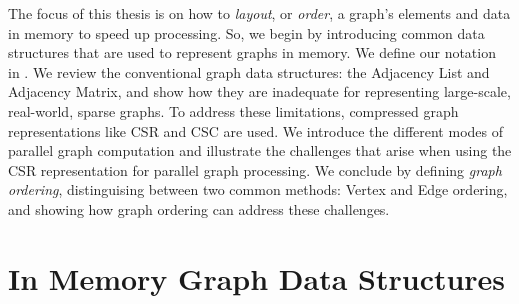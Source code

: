 The focus of this thesis is on how to \textit{layout}, or \textit{order}, a graph's elements and data in memory to speed up processing. So, we begin by introducing common data structures that are used to represent graphs in memory. 
 We define our notation in . We review the conventional graph data structures: the Adjacency List and Adjacency Matrix, and show how they are inadequate for representing large-scale, real-world, sparse graphs. To address these limitations, compressed graph representations like \ac{CSR} and \ac{CSC} are used. 
We introduce the different modes of parallel graph computation and illustrate the challenges that arise when using the \ac{CSR} representation for parallel graph processing. We conclude by defining \textit{graph ordering}, distinguising between two common methods: Vertex and Edge ordering, and showing how graph
ordering can address these challenges. 
\clearpage

\newpage


\section{In Memory Graph Data Structures}\label{sec:in_mem_structs}


